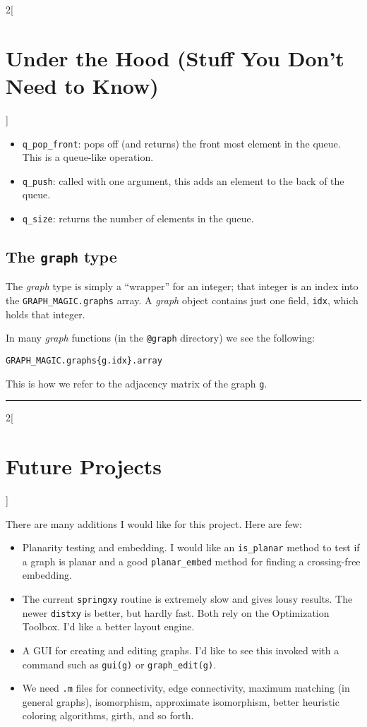 \documentclass{amsart}
\begin{document}
\begin{multicols}{2}[\section{Under the Hood (Stuff You Don't Need to Know)}]
\begin{itemize}
\item \verb|q_pop_front|: pops off (and returns) the front most element in the
  queue. This is a queue-like operation.

\item \verb|q_push|: called with one argument, this adds an element to
  the back of the queue.

\item \verb|q_size|: returns the number of elements in the queue. 
\end{itemize}


\subsection{The \texttt{graph} type}

The \emph{graph} type is simply a ``wrapper'' for an integer; that
integer is an index into the \verb|GRAPH_MAGIC.graphs| array.  A
\emph{graph} object contains just one field, \verb|idx|, which holds
that integer.

In many \emph{graph} functions (in the \verb|@graph| directory) we see
the following:
\begin{verbatim}
GRAPH_MAGIC.graphs{g.idx}.array
\end{verbatim}
This is how we refer to the adjacency matrix of the graph \verb|g|.

\end{multicols}
\hrule
\begin{multicols}{2}[\section{Future Projects}]

There are many additions I would like for this project. Here are
few:
\begin{itemize}
\item Planarity testing and embedding. I would like an \verb|is_planar|
  method to test if a graph is planar and a good \verb|planar_embed|
  method for finding a crossing-free embedding.

\item The current \verb|springxy| routine is extremely slow and gives lousy
  results. The newer \verb|distxy| is better, but  hardly fast. Both
  rely on the Optimization Toolbox. I'd like a better layout engine.

\item A GUI for creating and editing graphs. I'd like to see this
  invoked with a command such as \verb|gui(g)| or
  \verb|graph_edit(g)|.
  
\item We need \verb|.m| files for connectivity, edge connectivity,
  maximum matching (in general graphs), isomorphism, approximate
  isomorphism, better heuristic coloring algorithms, girth, and so
  forth.
\end{itemize}

\end{multicols}
\end{document}
